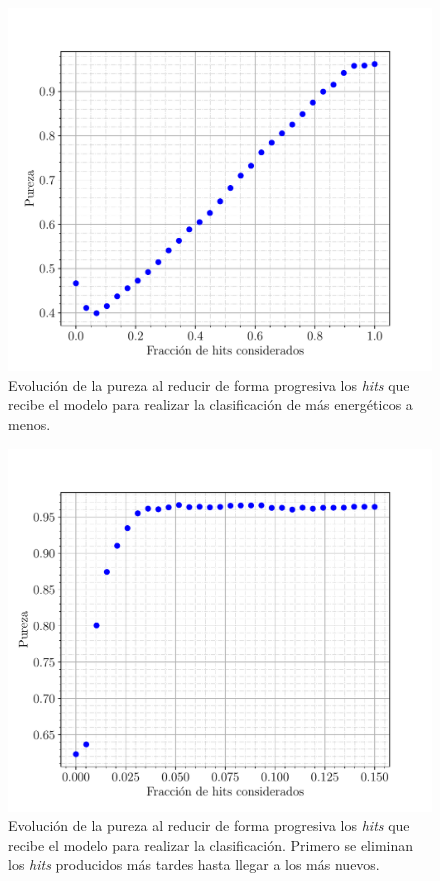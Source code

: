 \documentclass[a4paper,12pt,oneside,titlepage]{book}
\begin{document}
\begin{figure}[h!]
  \centering
  \includegraphics[scale=0.59, center]{pureza_ene.pdf}
  \caption{Evolución de la pureza al reducir de forma progresiva los \textit{hits} que recibe el modelo para realizar la clasificación de más energéticos a menos.}
  \label{fig:pur_ene}
\end{figure}

\begin{figure}[h!]
  \centering
  \includegraphics[scale=0.55, center]{pur_temp.pdf}
  \caption{Evolución de la pureza al reducir de forma progresiva los \textit{hits} que recibe el modelo para realizar la clasificación. Primero se eliminan los \textit{hits} producidos más tardes hasta llegar a los más nuevos.}
  \label{fig:pur_tem}
\end{figure}
\end{document}

